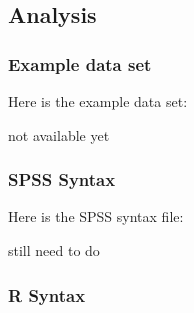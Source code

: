 \documentclass[
]{book}
\begin{document}
\hypertarget{analysis-1}{%
\subsection{Analysis}\label{analysis-1}}

\hypertarget{example-data-set-4}{%
\subsubsection{Example data set}\label{example-data-set-4}}

Here is the example data set:

not available yet

\hypertarget{spss-syntax-4}{%
\subsubsection{SPSS Syntax}\label{spss-syntax-4}}

Here is the SPSS syntax file:

still need to do

\hypertarget{r-syntax-4}{%
\subsubsection{R Syntax}\label{r-syntax-4}}
\end{document}
